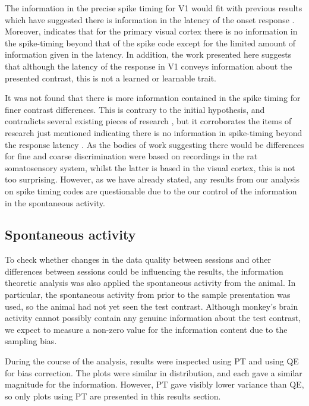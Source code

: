The information in the precise spike timing for \ac{V1} would fit with previous results which have suggested there is information in the latency of the onset response
\citep{Reich2001,Tovee1993,Rolls2011}.
Moreover, \citep{Tovee1993,Rolls2011} indicates that for the primary visual cortex there is no information in the spike-timing beyond that of the spike code except for the limited amount of information given in the latency.
In addition, the work presented here suggests that although the latency of the response in \ac{V1} conveys information about the presented contrast, this is not a learned or learnable trait.


It was not found that there is more information contained in the spike timing for finer contrast differences.
This is contrary to the initial hypothesis, and contradicts several existing pieces of research \citep{Reich2001,Arabzadeh2006}, but it corroborates the items of research just mentioned indicating there is no information in spike-timing beyond the response latency \citep{Reich2001,Tovee1993,Rolls2011}.
As the bodies of work suggesting there would be differences for fine and coarse discrimination were based on recordings in the rat somatosensory system, whilst the latter is based in the visual cortex, this is not too surprising.
However, as we have already stated, any results from our analysis on spike timing codes are questionable due to the our control of the information in the spontaneous activity.


\subsection{Spontaneous activity}

To check whether changes in the data quality between sessions and other differences between sessions could be influencing the results, the information theoretic analysis was also applied the spontaneous activity from the animal.
In particular, the spontaneous activity from prior to the sample presentation was used, so the animal had not yet seen the test contrast.
Although monkey's brain activity cannot possibly contain any genuine information about the test contrast, we expect to measure a non-zero value for the information content due to the sampling bias.

During the course of the analysis, results were inspected using \ac{PT} and using \ac{QE} for bias correction.
The plots were similar in distribution, and each gave a similar magnitude for the information.
However, \ac{PT} gave visibly lower variance than \ac{QE}, so only plots using \ac{PT} are presented in this results section.

